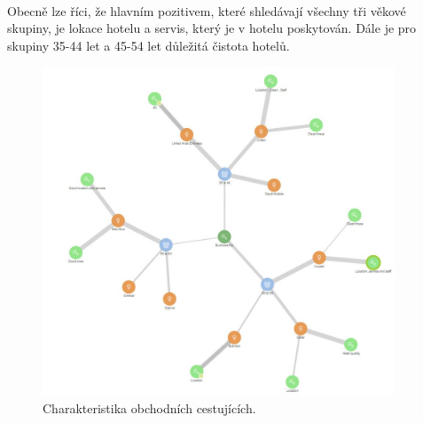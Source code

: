 \documentclass[czech,BP]{thesiskiv}
\begin{document}
\\
Obecně lze říci, že hlavním pozitivem, které shledávají všechny tři věkové skupiny, je lokace hotelu a servis, který je v hotelu poskytován. Dále je pro skupiny 35-44 let a 45-54 let důležitá čistota hotelů.
\begin{figure}[htbp]
	\centering
	\includegraphics[width = 10.5cm]{img/Business_trip_customers_proportions.jpg}
	\caption{Charakteristika obchodních cestujících.}
	\label{fig:Business}	
\end{figure}
\end{document}
